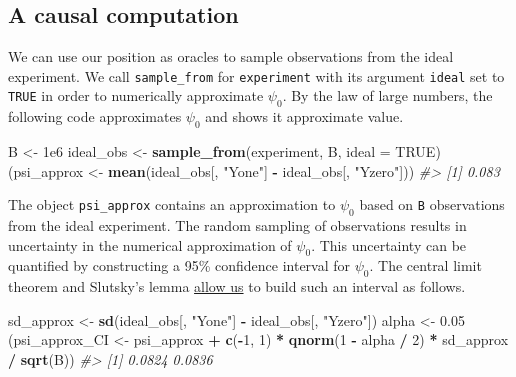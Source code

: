 \documentclass[11pt,openright,twoside]{book}
\newenvironment{Shaded}{\begin{snugshade}}{\end{snugshade}}
\newcommand{\CommentTok}[1]{\textcolor[rgb]{0.56,0.35,0.01}{\textit{#1}}}
\newcommand{\DataTypeTok}[1]{\textcolor[rgb]{0.13,0.29,0.53}{#1}}
\newcommand{\DecValTok}[1]{\textcolor[rgb]{0.00,0.00,0.81}{#1}}
\newcommand{\FloatTok}[1]{\textcolor[rgb]{0.00,0.00,0.81}{#1}}
\newcommand{\KeywordTok}[1]{\textcolor[rgb]{0.13,0.29,0.53}{\textbf{#1}}}
\newcommand{\NormalTok}[1]{#1}
\newcommand{\OperatorTok}[1]{\textcolor[rgb]{0.81,0.36,0.00}{\textbf{#1}}}
\newcommand{\OtherTok}[1]{\textcolor[rgb]{0.56,0.35,0.01}{#1}}
\newcommand{\StringTok}[1]{\textcolor[rgb]{0.31,0.60,0.02}{#1}}
\theoremstyle{definition}
\theoremstyle{definition}
\theoremstyle{definition}
\theoremstyle{remark}
\begin{document}
\hypertarget{causal-computation}{%
\subsection{A causal computation}\label{causal-computation}}

We can use our position as oracles to sample observations from the ideal
experiment. We call \texttt{sample\_from} for \texttt{experiment} with its argument \texttt{ideal}
set to \texttt{TRUE} in order to numerically approximate \(\psi_{0}\). By the law of
large numbers, the following code approximates \(\psi_{0}\) and shows it
approximate value.

\begin{Shaded}
\begin{Highlighting}[]
\NormalTok{B <-}\StringTok{ }\FloatTok{1e6}
\NormalTok{ideal_obs <-}\StringTok{ }\KeywordTok{sample_from}\NormalTok{(experiment, B, }\DataTypeTok{ideal =} \OtherTok{TRUE}\NormalTok{)}
\NormalTok{(psi_approx <-}\StringTok{ }\KeywordTok{mean}\NormalTok{(ideal_obs[, }\StringTok{"Yone"}\NormalTok{] }\OperatorTok{-}\StringTok{ }\NormalTok{ideal_obs[, }\StringTok{"Yzero"}\NormalTok{]))}
\CommentTok{#> [1] 0.083}
\end{Highlighting}
\end{Shaded}

The object \texttt{psi\_approx} contains an approximation to \(\psi_0\) based on \texttt{B}
observations from the ideal experiment. The random sampling of observations
results in uncertainty in the numerical approximation of \(\psi_0\). This
uncertainty can be quantified by constructing a 95\% confidence interval for
\(\psi_0\). The central limit theorem and Slutsky's lemma \protect\hyperlink{clt}{allow us} to
build such an interval as follows.

\begin{Shaded}
\begin{Highlighting}[]
\NormalTok{sd_approx <-}\StringTok{ }\KeywordTok{sd}\NormalTok{(ideal_obs[, }\StringTok{"Yone"}\NormalTok{] }\OperatorTok{-}\StringTok{ }\NormalTok{ideal_obs[, }\StringTok{"Yzero"}\NormalTok{])}
\NormalTok{alpha <-}\StringTok{ }\FloatTok{0.05}
\NormalTok{(psi_approx_CI <-}\StringTok{ }\NormalTok{psi_approx }\OperatorTok{+}\StringTok{ }\KeywordTok{c}\NormalTok{(}\OperatorTok{-}\DecValTok{1}\NormalTok{, }\DecValTok{1}\NormalTok{) }\OperatorTok{*}
\StringTok{   }\KeywordTok{qnorm}\NormalTok{(}\DecValTok{1} \OperatorTok{-}\StringTok{ }\NormalTok{alpha }\OperatorTok{/}\StringTok{ }\DecValTok{2}\NormalTok{) }\OperatorTok{*}\StringTok{ }\NormalTok{sd_approx }\OperatorTok{/}\StringTok{ }\KeywordTok{sqrt}\NormalTok{(B))}
\CommentTok{#> [1] 0.0824 0.0836}
\end{Highlighting}
\end{Shaded}
\end{document}
